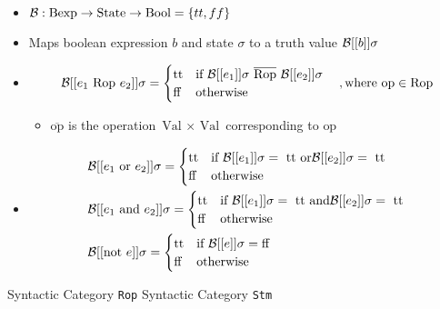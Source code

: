 \begin{itemize}
\begin{itemize}
\begin{itemize}
                    \item $\mathcal{B}: \text{Bexp} \to \text{State} \to \text{Bool} = \{tt, ff\} $
                    \item Maps boolean expression $b$ and state $\sigma$ to a truth value $\mathcal{B}[[b]]\sigma$
                    \item
                        \[
                            \mc{B}[[e_1 \text{ Rop } e_2]] \sigma =
\begin{cases}
    \text{tt} &\text{if } \mc{B}[[e_1]] \sigma \ \overline{\text{Rop}} \ \mc{B}[[e_2]] \sigma\\
    \text{ff} &\text{otherwise}
\end{cases}\quad ,\text{where op} \in \text{Rop}
                        \]
                        \begin{itemize}
                            \item $\overline{\text{op}}$ is the operation $\text{Val } \times \text{ Val}$ corresponding to $\text{op}$
                        \end{itemize}
                    \item
                        \begin{align*}
                            &\mathcal{B}[[e_1 \text{ or } e_2]] \sigma =
\begin{cases}
    \text{tt} &\text{if } \mathcal{B}[[e_1]] \sigma = \text{ tt or} \mathcal{B}[[e_2]] \sigma = \text{ tt}\\
    \text{ff} &\text{otherwise}
\end{cases}\\
                            &\mathcal{B}[[e_1 \text{ and } e_2]] \sigma =
\begin{cases}
    \text{tt} &\text{if } \mathcal{B}[[e_1]] \sigma = \text{ tt and} \mathcal{B}[[e_2]] \sigma = \text{ tt}\\
    \text{ff} &\text{otherwise}
\end{cases}\\
                            &\mathcal{B}[[\text{not } e]] \sigma =
\begin{cases}
    \text{tt} &\text{if } \mathcal{B}[[e]] \sigma = \text{ff}\\
    \text{ff} &\text{otherwise}
\end{cases}\\
                        \end{align*}
                \end{itemize}
             Syntactic Category \verb+Rop+
             Syntactic Category \verb+Stm+
        \end{itemize}
\end{itemize}

